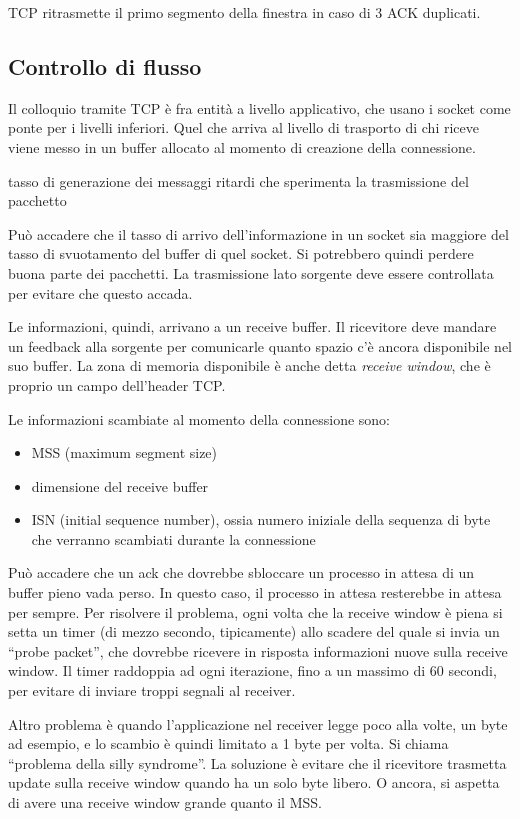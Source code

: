 TCP ritrasmette il primo segmento della finestra in caso di 3 ACK duplicati.

\subsection{Controllo di flusso}

Il colloquio tramite TCP \`e fra entit\`a a livello applicativo, che usano i socket come ponte per i livelli inferiori. Quel che arriva al livello di trasporto di chi riceve viene messo in un buffer allocato al momento di creazione della connessione.

tasso di generazione dei messaggi
ritardi che sperimenta la trasmissione del pacchetto

Pu\`o accadere che il tasso di arrivo dell'informazione in un socket sia maggiore del tasso di svuotamento del buffer di quel socket. Si potrebbero quindi perdere buona parte dei pacchetti. La trasmissione lato sorgente deve essere controllata per evitare che questo accada. 

Le informazioni, quindi, arrivano a un receive buffer. Il ricevitore deve mandare un feedback alla sorgente per comunicarle quanto spazio c'\`e ancora disponibile nel suo buffer. La zona di memoria disponibile \`e anche detta \emph{receive window}, che \`e proprio un campo dell'header TCP.

Le informazioni scambiate al momento della connessione sono:

\begin{itemize}
    \item MSS (maximum segment size)
    \item dimensione del receive buffer
    \item ISN (initial sequence number), ossia numero iniziale della sequenza di byte che verranno scambiati durante la connessione
\end{itemize}

Pu\`o accadere che un ack che dovrebbe sbloccare un processo in attesa di un buffer pieno vada perso. In questo caso, il processo in attesa resterebbe in attesa per sempre. Per risolvere il problema, ogni volta che la receive window \`e piena si setta un timer (di mezzo secondo, tipicamente) allo scadere del quale si invia un ``probe packet'', che dovrebbe ricevere in risposta informazioni nuove sulla receive window. Il timer raddoppia ad ogni iterazione, fino a un massimo di 60 secondi, per evitare di inviare troppi segnali al receiver.

Altro problema \`e quando l'applicazione nel receiver legge poco alla volte, un byte ad esempio, e lo scambio \`e quindi limitato a 1 byte per volta. Si chiama ``problema della silly syndrome''. La soluzione \`e evitare che il ricevitore trasmetta update sulla receive window quando ha un solo byte libero. O ancora, si aspetta di avere una receive window grande quanto il MSS.

